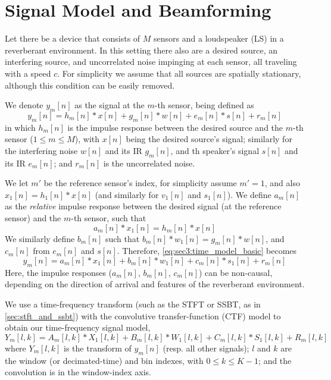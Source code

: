 \section{Signal Model and Beamforming}
\label{sec:signal_model}

Let there be a device that consists of $M$ sensors and a loudspeaker (LS) in a reverberant environment. In this setting there also are a desired source, an interfering source, and uncorrelated noise impinging at each sensor, all traveling with a speed $c$. For simplicity we assume that all sources are spatially stationary, although this condition can be easily removed.

We denote $y_m[n]$ as the signal at the $m$-th sensor, being defined as
\begin{equation}
	\label{eq:sec3:time_model_basic}
	y_m[n] = h_m[n] \ast x[n] + g_m[n] \ast w[n] + e_m[n] \ast s[n] + r_m[n]
\end{equation}
in which $h_m[n]$ is the impulse response between the desired source and the $m$-th sensor ($1 \leq m \leq M$), with $x[n]$ being the desired source's signal; similarly for the interfering noise $w[n]$ and its IR $g_m[n]$, and th speaker's signal $s[n]$ and its IR $e_m[n]$; and $r_m[n]$ is the uncorrelated noise.

We let $m'$ be the reference sensor's index, for simplicity assume $m' = 1$, and also $x_1[n] = h_1[n] \ast x[n]$ (and similarly for $v_1[n]$ and $s_1[n]$). We define $a_m[n]$ as the \textit{relative} impulse response between the desired signal (at the reference sensor) and the $m$-th sensor, such that
\begin{equation}
	a_m[n] \ast x_1[n] = h_m[n] \ast x[n]
\end{equation}
We similarly define $b_m[n]$ such that $b_m[n] \ast w_1[n] = g_m[n] \ast w[n]$, and $c_m[n]$ from $e_m[n]$ and $s[n]$. Therefore, \cref{eq:sec3:time_model_basic} becomes
\begin{equation}
	\label{eq:sec3:time_model_relative}
	y_m[n] = a_m[n] \ast x_1[n] + b_m[n] \ast w_1[n] + c_m[n] \ast s_1[n] + r_m[n]
\end{equation}
Here, the impulse responses ($a_m[n]$, $b_m[n]$, $c_m[n]$) can be non-causal, depending on the direction of arrival and features of the reverberant environment.

We use a time-frequency transform (such as the STFT or SSBT, as in \cref{sec:stft_and_ssbt}) with the convolutive transfer-function (CTF) model \cite{talmon_relative_2009} to obtain our time-frequency signal model,
\begin{equation}
	\label{eq:sec3:time-freq_model_conv}
	Y_m[l,k] = A_m[l,k] \ast X_1[l,k] + B_m[l,k] \ast W_1[l,k] + C_m[l,k] \ast S_1[l,k] + R_m[l,k]
\end{equation}
where $Y_m[l,k]$ is the transform of $y_m[n]$ (resp. all other signals); $l$ and $k$ are the window (or decimated-time) and bin indexes, with $0 \leq k \leq K-1$; and the convolution is in the window-index axis.

